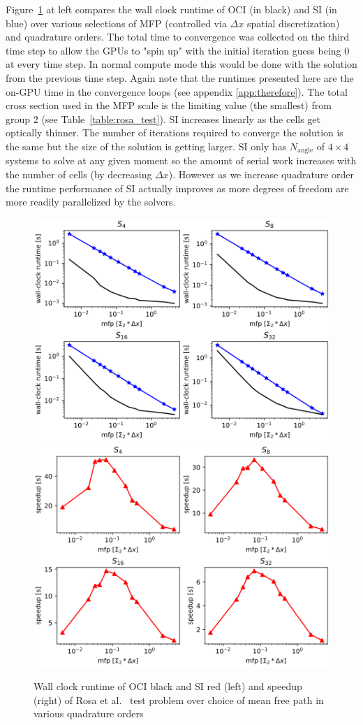 Figure~\ref{fig:perf} at left compares the wall clock runtime of OCI (in black) and SI (in blue) over various selections of MFP (controlled via $\Delta x$ spatial discretization) and quadrature orders.
The total time to convergence was collected on the third time step to allow the GPUs to "spin up" with the initial iteration guess being 0 at every time step.
In normal compute mode this would be done with the solution from the previous time step.
Again note that the runtimes presented here are the on-GPU time in the convergence loops (see appendix \ref{app:therefore}).
The total cross section used in the MFP scale is the limiting value (the smallest) from group 2 (see Table~\ref{table:rosa_test}).
SI increases linearly as the cells get optically thinner.
The number of iterations required to converge the solution is the same but the size of the solution is getting larger.
SI only has $N_{\text{angle}}$ of $4\times 4$ systems to solve at any given moment so the amount of serial work increases with the number of cells (by decreasing $\Delta x$).
However as we increase quadrature order the runtime performance of SI actually improves as more degrees of freedom are more readily parallelized by the solvers.

\begin{figure}[h!]
    \centering
    \includegraphics[width=.49\textwidth]{figures/results/runtime.png}
    \includegraphics[width=.49\textwidth]{figures/results/speedup.png}
    \caption{Wall clock runtime of OCI black and SI red (left) and speedup (right) of Rosa et al.~\cite{rosa_cellwise_2013} test problem over choice of mean free path in various quadrature orders}
    \label{fig:perf}
\end{figure}

